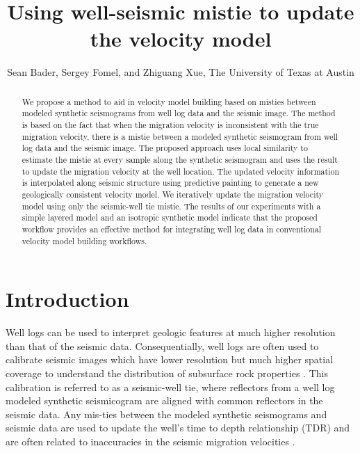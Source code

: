 
\title{Using well-seismic mistie to update the velocity model}

\author{Sean Bader, Sergey Fomel, and Zhiguang Xue, The University of Texas at Austin}

\maketitle


\begin{abstract}
We propose a method to aid in velocity model building based on misties between modeled synthetic seismograms from well log data and the seismic image. The method is based on the fact that when the migration velocity is inconsistent with the true migration velocity, there is a mistie between a modeled synthetic seismogram from well log data and the seismic image. The proposed approach uses local similarity to estimate the mistie at every sample along the synthetic seismogram and uses the result to update the migration velocity at the well location. The updated velocity information is interpolated along seismic structure using predictive painting to generate a new geologically consistent velocity model. We iteratively update the migration velocity model using only the seismic-well tie mistie. The results of our experiments with a simple layered model and an isotropic synthetic model indicate that the proposed workflow provides an effective method for integrating well log data in conventional velocity model building workflows.
\end{abstract}

\section{Introduction}
Well logs can be used to interpret geologic features at much higher resolution than that of the seismic data. Consequentially, well logs are often used to calibrate seismic images which have lower resolution but much higher spatial coverage to understand the distribution of subsurface rock properties \cite[]{whitesimm2003}. This calibration is referred to as a seismic-well tie, where reflectors from a well log modeled synthetic seismicogram are aligned with common reflectors in the seismic data. Any mis-ties between the modeled synthetic seismograms and seismic data are used to update the well's time to depth relationship (TDR) and are often related to inaccuracies in the seismic migration velocities \cite[]{white1998stretch}.

